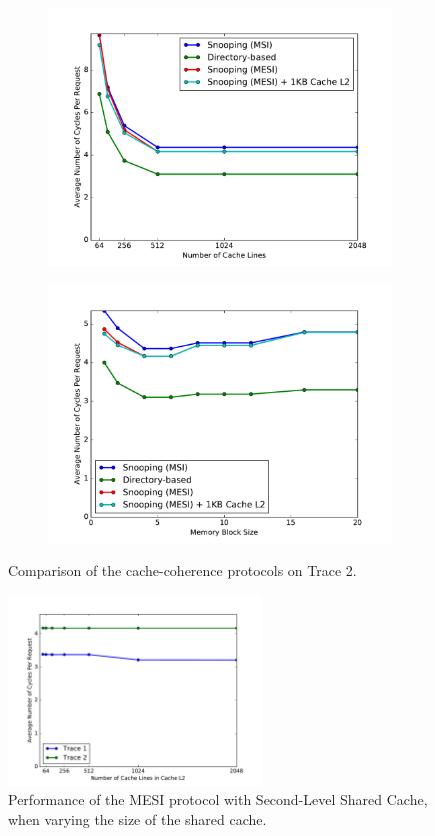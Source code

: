 \documentclass[12pt, a4paper, twoside]{article}
\begin{document}
\begin{figure}[h]
\centering
\begin{subfigure}{0.48\textwidth}
\includegraphics[width=\textwidth]{figs/fig-2-1.pdf}
\end{subfigure}
\begin{subfigure}{0.48\textwidth}
\includegraphics[width=\textwidth]{figs/fig-2-2.pdf}
\end{subfigure}
\caption{Comparison of the cache-coherence protocols on Trace 2.}
\end{figure}

\begin{figure}[h]
\centering
\includegraphics[width=0.6\textwidth]{figs/fig-3.pdf}
\caption{Performance of the MESI protocol with Second-Level Shared Cache, when varying the size of the shared cache.}
\end{figure}
\end{document}
